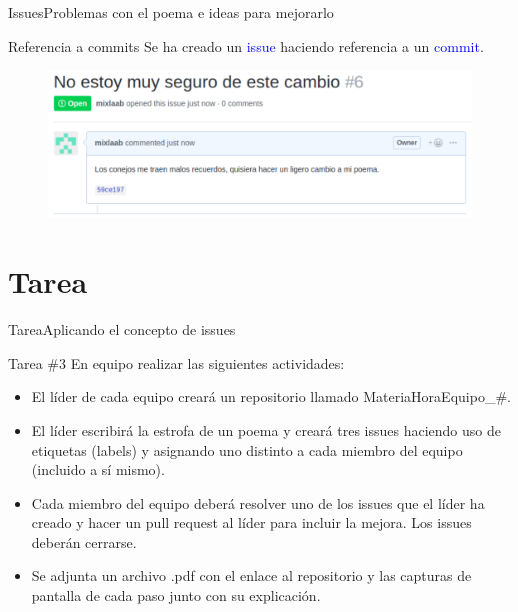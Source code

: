 \documentclass[10pt]{beamer}
\begin{document}
\begin{frame}{Issues}{Problemas con el poema e ideas para mejorarlo}

\begin{block}{Referencia a commits}
Se ha creado un \textcolor{blue}{issue} haciendo referencia a un \textcolor{blue}{commit}.
\vspace{0.1in}
\begin{figure}[h!]
\centering
\includegraphics [scale=0.42]{commitreference2}
\label{fig:first}
\end{figure}
    
\end{block}

\end{frame}

\section{Tarea}
\begin{frame}{Tarea}{Aplicando el concepto de issues}

\begin{block}{Tarea \#3}%
En equipo realizar las siguientes actividades:
\vspace{0.1in}
\begin{itemize}
    \item El líder de cada equipo creará un repositorio llamado MateriaHoraEquipo\_\#.
    \item El líder escribirá la estrofa de un poema y creará tres issues haciendo uso de etiquetas (labels) y asignando uno distinto a cada miembro del equipo (incluido a sí mismo).
    \item Cada miembro del equipo deberá resolver uno de los issues que el líder ha creado y hacer un pull request al líder para incluir la mejora. Los issues deberán cerrarse.
    \item Se adjunta un archivo .pdf con el enlace al repositorio y las capturas de pantalla de cada paso junto con su explicación.
\end{itemize}
    
\end{block}

\end{frame}
\end{document}

